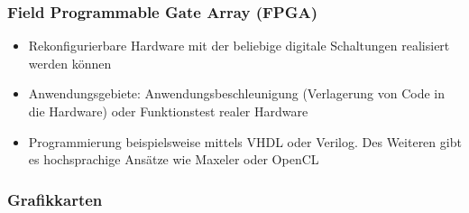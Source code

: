 \subsubsection{Field Programmable Gate Array (FPGA)}
\begin{itemize}
	\item Rekonfigurierbare Hardware mit der beliebige digitale Schaltungen realisiert werden können
	\item Anwendungsgebiete: Anwendungsbeschleunigung (Verlagerung von Code in die Hardware) oder Funktionstest realer Hardware
	\item Programmierung beispielsweise mittels VHDL oder Verilog. Des Weiteren gibt es hochsprachige Ansätze wie Maxeler oder OpenCL
\end{itemize}

\subsubsection{Grafikkarten}
